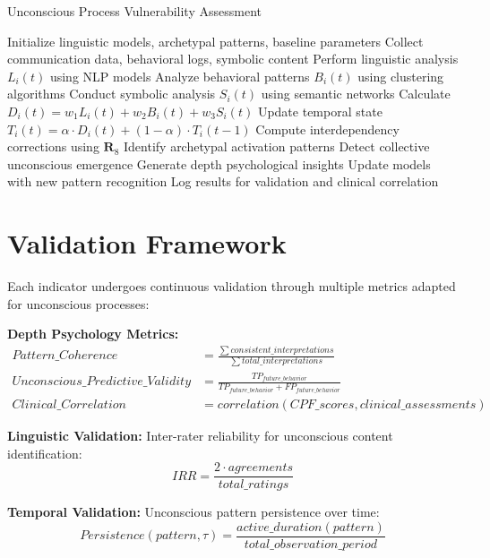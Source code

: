 \documentclass[11pt,a4paper]{article}
\begin{document}
\begin{algorithm}
\caption{Unconscious Process Vulnerability Assessment}
\begin{algorithmic}[1]
\STATE Initialize linguistic models, archetypal patterns, baseline parameters
    \STATE Collect communication data, behavioral logs, symbolic content
        \STATE Perform linguistic analysis $L_i(t)$ using NLP models
        \STATE Analyze behavioral patterns $B_i(t)$ using clustering algorithms
        \STATE Conduct symbolic analysis $S_i(t)$ using semantic networks
        \STATE Calculate $D_i(t) = w_1 L_i(t) + w_2 B_i(t) + w_3 S_i(t)$
        \STATE Update temporal state $T_i(t) = \alpha \cdot D_i(t) + (1-\alpha) \cdot T_i(t-1)$
    \ENDFOR
    \STATE Compute interdependency corrections using $\mathbf{R}_8$
    \STATE Identify archetypal activation patterns
    \STATE Detect collective unconscious emergence
    \STATE Generate depth psychological insights
    \STATE Update models with new pattern recognition
    \STATE Log results for validation and clinical correlation
\ENDFOR
\end{algorithmic}
\end{algorithm}

\section{Validation Framework}

Each indicator undergoes continuous validation through multiple metrics adapted for unconscious processes:

\textbf{Depth Psychology Metrics:}
\begin{align}
Pattern\_Coherence &= \frac{\sum consistent\_interpretations}{\sum total\_interpretations} \\
Unconscious\_Predictive\_Validity &= \frac{TP_{future\_behavior}}{TP_{future\_behavior} + FP_{future\_behavior}} \\
Clinical\_Correlation &= correlation(CPF\_scores, clinical\_assessments)
\end{align}

\textbf{Linguistic Validation:}
Inter-rater reliability for unconscious content identification:
\begin{equation}
IRR = \frac{2 \cdot agreements}{total\_ratings}
\end{equation}

\textbf{Temporal Validation:}
Unconscious pattern persistence over time:
\begin{equation}
Persistence(pattern,\tau) = \frac{active\_duration(pattern)}{total\_observation\_period}
\end{equation}
\end{document}
